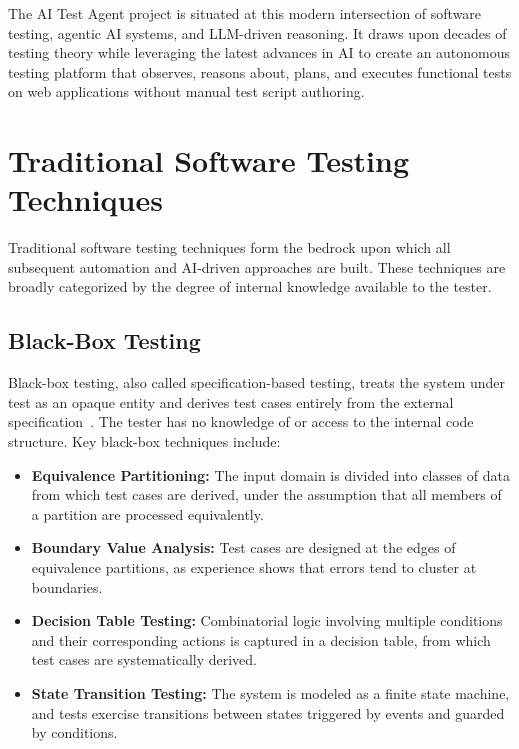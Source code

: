 The AI Test Agent project is situated at this modern intersection of software
testing, agentic AI systems, and LLM-driven reasoning. It draws upon decades
of testing theory while leveraging the latest advances in AI to create an
autonomous testing platform that observes, reasons about, plans, and executes
functional tests on web applications without manual test script authoring.

\section{Traditional Software Testing Techniques}
\label{sec:traditional_testing}

Traditional software testing techniques form the bedrock upon which all
subsequent automation and AI-driven approaches are built. These techniques
are broadly categorized by the degree of internal knowledge available to
the tester.

\subsection{Black-Box Testing}
\label{subsec:black_box}

Black-box testing, also called specification-based testing, treats the system
under test as an opaque entity and derives test cases entirely from the
external specification~\cite{myers2011art}. The tester has no knowledge of or
access to the internal code structure. Key black-box techniques include:

\begin{itemize}[nosep]
  \item \textbf{Equivalence Partitioning:} The input domain is divided into
        classes of data from which test cases are derived, under the
        assumption that all members of a partition are processed equivalently.
  \item \textbf{Boundary Value Analysis:} Test cases are designed at the
        edges of equivalence partitions, as experience shows that errors
        tend to cluster at boundaries.
  \item \textbf{Decision Table Testing:} Combinatorial logic involving
        multiple conditions and their corresponding actions is captured
        in a decision table, from which test cases are systematically derived.
  \item \textbf{State Transition Testing:} The system is modeled as a finite
        state machine, and tests exercise transitions between states triggered
        by events and guarded by conditions.
\end{itemize}

